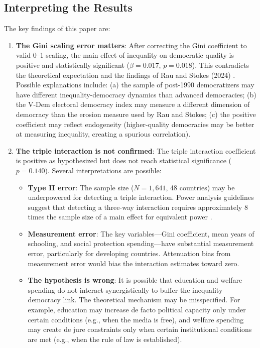 \documentclass[11pt,letterpaper]{article}
\begin{document}
\subsection{Interpreting the Results}

The key findings of this paper are:

\begin{enumerate}
    \item \textbf{The Gini scaling error matters}: After correcting the Gini coefficient to valid 0--1 scaling, the main effect of inequality on democratic quality is positive and statistically significant ($\beta = 0.017$, $p = 0.018$). This contradicts the theoretical expectation and the findings of Rau and Stokes (2024) \cite{Rau2024}. Possible explanations include: (a) the sample of post-1990 democratizers may have different inequality-democracy dynamics than advanced democracies; (b) the V-Dem electoral democracy index may measure a different dimension of democracy than the erosion measure used by Rau and Stokes; (c) the positive coefficient may reflect endogeneity (higher-quality democracies may be better at measuring inequality, creating a spurious correlation).
    
    \item \textbf{The triple interaction is not confirmed}: The triple interaction coefficient is positive as hypothesized but does not reach statistical significance ($p = 0.140$). Several interpretations are possible:
     \begin{itemize}
        \item \textbf{Type II error}: The sample size ($N = 1,641$, 48 countries) may be underpowered for detecting a triple interaction. Power analysis guidelines suggest that detecting a three-way interaction requires approximately 8 times the sample size of a main effect for equivalent power \cite{Aguinis2005}.
        \item \textbf{Measurement error}: The key variables---Gini coefficient, mean years of schooling, and social protection spending---have substantial measurement error, particularly for developing countries. Attenuation bias from measurement error would bias the interaction estimates toward zero.
        \item \textbf{The hypothesis is wrong}: It is possible that education and welfare spending do not interact synergistically to buffer the inequality-democracy link. The theoretical mechanism may be misspecified. For example, education may increase de facto political capacity only under certain conditions (e.g., when the media is free), and welfare spending may create de jure constraints only when certain institutional conditions are met (e.g., when the rule of law is established).
     \end{itemize}
    

\end{enumerate}
\end{document}
